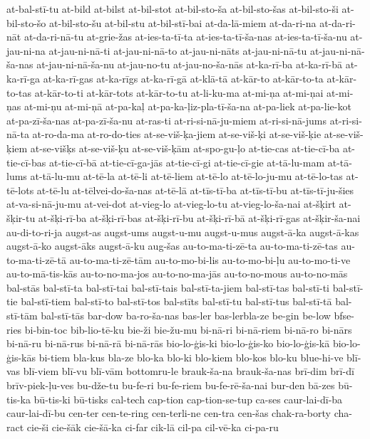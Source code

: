 {at-bal-stī-tu
at-bild
at-bilst
at-bil-stot
at-bil-sto-ša
at-bil-sto-šas
at-bil-sto-ši
at-bil-sto-šo
at-bil-sto-šu
at-bil-stu
at-bil-stī-bai
at-da-lā-miem
at-da-ri-na
at-da-ri-nāt
at-da-ri-nā-tu
at-grie-žas
at-ies-ta-tī-ta
at-ies-ta-tī-ša-nas
at-ies-ta-tī-ša-nu
at-jau-ni-na
at-jau-ni-nā-ti
at-jau-ni-nā-to
at-jau-ni-nāts
at-jau-ni-nā-tu
at-jau-ni-nā-ša-nas
at-jau-ni-nā-ša-nu
at-jau-no-tu
at-jau-no-ša-nās
at-ka-rī-ba
at-ka-rī-bā
at-ka-rī-ga
at-ka-rī-gas
at-ka-rīgs
at-ka-rī-gā
at-klā-tā
at-kār-to
at-kār-to-ta
at-kār-to-tas
at-kār-to-ti
at-kār-tots
at-kār-to-tu
at-li-ku-ma
at-mi-ņa
at-mi-ņai
at-mi-ņas
at-mi-ņu
at-mi-ņā
at-pa-kaļ
at-pa-ka-ļiz-pla-tī-ša-na
at-pa-liek
at-pa-lie-kot
at-pa-zī-ša-nas
at-pa-zī-ša-nu
at-ras-ti
at-ri-si-nā-ju-miem
at-ri-si-nā-jums
at-ri-si-nā-ta
at-ro-da-ma
at-ro-do-ties
at-se-viš-ķa-jiem
at-se-viš-ķi
at-se-viš-ķie
at-se-viš-ķiem
at-se-višķs
at-se-viš-ķu
at-se-viš-ķām
at-spo-gu-ļo
at-tie-cas
at-tie-cī-ba
at-tie-cī-bas
at-tie-cī-bā
at-tie-cī-ga-jās
at-tie-cī-gi
at-tie-cī-gie
at-tā-lu-mam
at-tā-lums
at-tā-lu-mu
at-tē-la
at-tē-li
at-tē-liem
at-tē-lo
at-tē-lo-ju-mu
at-tē-lo-tas
at-tē-lots
at-tē-lu
at-tēlvei-do-ša-nas
at-tē-lā
at-tīs-tī-ba
at-tīs-tī-bu
at-tīs-tī-ju-šies
at-va-si-nā-ju-mu
at-vei-dot
at-vieg-lo
at-vieg-lo-tu
at-vieg-lo-ša-nai
at-šķirt
at-šķir-tu
at-šķi-rī-ba
at-šķi-rī-bas
at-šķi-rī-bu
at-šķi-rī-bā
at-šķi-rī-gas
at-šķir-ša-nai
au-di-to-ri-ja
augst-as
augst-ums
augst-u-mu
augst-u-mus
augst-ā-ka
augst-ā-kas
augst-ā-ko
augst-āks
augst-ā-ku
aug-šas
au-to-ma-ti-zē-ta
au-to-ma-ti-zē-tas
au-to-ma-ti-zē-tā
au-to-ma-ti-zē-tām
au-to-mo-bi-lis
au-to-mo-bi-ļu
au-to-mo-ti-ve
au-to-mā-tis-kās
au-to-no-ma-jos
au-to-no-ma-jās
au-to-no-mous
au-to-no-mās
bal-stās
bal-stī-ta
bal-stī-tai
bal-stī-tais
bal-stī-ta-jiem
bal-stī-tas
bal-stī-ti
bal-stī-tie
bal-stī-tiem
bal-stī-to
bal-stī-tos
bal-stīts
bal-stī-tu
bal-stī-tus
bal-stī-tā
bal-stī-tām
bal-stī-tās
bar-dow
ba-ro-ša-nas
bas-ler
bas-lerbla-ze
be-gin
be-low
bfse-ries
bi-bin-toc
bib-lio-tē-ku
bie-ži
bie-žu-mu
bi-nā-ri
bi-nā-riem
bi-nā-ro
bi-nārs
bi-nā-ru
bi-nā-rus
bi-nā-rā
bi-nā-rās
bio-lo-ģis-ki
bio-lo-ģis-ko
bio-lo-ģis-kā
bio-lo-ģis-kās
bi-tiem
bla-kus
bla-ze
blo-ka
blo-ki
blo-kiem
blo-kos
blo-ku
blue-hi-ve
blī-vas
blī-viem
blī-vu
blī-vām
bottomru-le
brauk-ša-na
brauk-ša-nas
brī-dim
brī-dī
brīv-piek-ļu-ves
bu-dže-tu
bu-fe-ri
bu-fe-riem
bu-fe-rē-ša-nai
bur-den
bā-zes
bū-tis-ka
bū-tis-ki
bū-tisks
cal-tech
cap-tion
cap-tion-se-tup
ca-ses
caur-lai-dī-ba
caur-lai-dī-bu
cen-ter
cen-te-ring
cen-terli-ne
cen-tra
cen-šas
chak-ra-borty
cha-ract
cie-ši
cie-šāk
cie-šā-ka
ci-far
cik-lā
cil-pa
cil-vē-ka
ci-pa-ru
}
